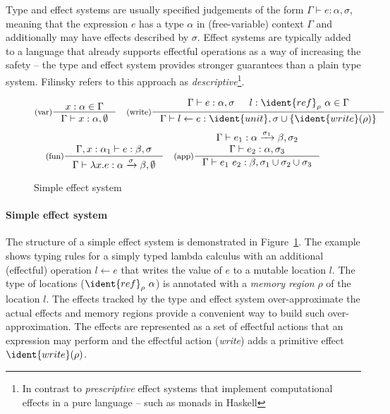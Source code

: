 Type and effect systems are usually specified judgements of the form $\Gamma \vdash e : \alpha, \sigma$, 
meaning that the expression $e$ has a type $\alpha$ in (free-variable) context $\Gamma$ and 
additionally may have effects described by $\sigma$. Effect systems are typically added to a 
language that already supports effectful operations as a way of increasing the safety -- the type
and effect system provides stronger guarantees than a plain type system. Filinsky 
\cite{effects-comprehensive} refers to this approach as \emph{descriptive}\footnote{In contrast
to \emph{prescriptive} effect systems that implement computational effects in a pure language 
-- such as monads in Haskell}.


\begin{figure}[t]
\begin{equation*}
\inference[(var)]
  {x:\alpha \in \Gamma }
  {\Gamma \vdash x : \alpha, \emptyset }
\quad
\inference[(write)]
  {\Gamma \vdash e : \alpha, \sigma & l:\ident{ref}_\rho~\alpha\in \Gamma}
  {\Gamma \vdash l \leftarrow e : \ident{unit}, \sigma \cup \{\ident{write}(\rho)\} }
\end{equation*}
\begin{equation*}
\inference[(fun)]
  {\Gamma, x:\alpha_1 \vdash e : \beta, \sigma }
  {\Gamma \vdash \lambda x.e : \alpha \xrightarrow{\sigma} \beta, \emptyset }
\quad  
\inference[(app)]
  {\Gamma \vdash e_1 : \alpha \xrightarrow{\sigma_1} \beta, \sigma_2 \\
   \Gamma \vdash e_2 : \alpha, \sigma_3 }
  {\Gamma \vdash e_1~e_2 : \beta, \sigma_1 \cup \sigma_2 \cup \sigma_3 }
\end{equation*}

\caption{Simple effect system}
\label{fig:path-eff}
\end{figure}


\paragraph{Simple effect system}
The structure of a simple effect system is demonstrated in Figure~\ref{fig:path-eff}. The example
shows typing rules for a simply typed lambda calculus with an additional (effectful) operation
$l \leftarrow e$ that writes the value of $e$ to a mutable location $l$. The type of locations
($\ident{ref}_\rho~\alpha$) is annotated with a \emph{memory region} $\rho$ of the location $l$.
The effects tracked by the type and effect system over-approximate the actual effects and memory
regions provide a convenient way to build such over-approximation. The effects are 
represented as a set of effectful actions that an expression may perform and the effectful action
(\emph{write}) adds a primitive effect $\ident{write}(\rho)$.

